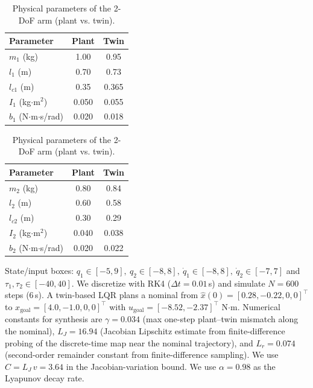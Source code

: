 \documentclass[letterpaper, 10 pt, conference]{ieeeconf}
\begin{document}
\begin{table}[ht]
\centering
\caption{Physical parameters of the 2-DoF arm (plant vs. twin).}
\label{tab:parameters}
\setlength{\tabcolsep}{4pt}
\renewcommand{\arraystretch}{1.05}
\begin{minipage}[t]{0.48\columnwidth}
\centering
\begin{tabular}{lcc}
\toprule
Parameter & Plant & Twin \\
\midrule
$m_1$ (kg)             & 1.00  & 0.95  \\
$l_1$ (m)              & 0.70  & 0.73  \\
$l_{c1}$ (m)           & 0.35  & 0.365 \\
$I_1$ (kg$\cdot$m$^2$) & 0.050 & 0.055 \\
$b_1$ (N$\cdot$m$\cdot$s/rad) & 0.020 & 0.018 \\
\bottomrule
\end{tabular}
\end{minipage}\hfill
\begin{minipage}[t]{0.48\columnwidth}
\centering
\begin{tabular}{lcc}
\toprule
Parameter & Plant & Twin \\
\midrule
$m_2$ (kg)             & 0.80  & 0.84  \\
$l_2$ (m)              & 0.60  & 0.58  \\
$l_{c2}$ (m)           & 0.30  & 0.29  \\
$I_2$ (kg$\cdot$m$^2$) & 0.040 & 0.038 \\
$b_2$ (N$\cdot$m$\cdot$s/rad) & 0.020 & 0.022 \\
\bottomrule
\end{tabular}
\end{minipage}
\end{table}

State/input boxes:
$q_1\!\in[-5,9],\ q_2\!\in[-8,8],\ \dot q_1\!\in[-8,8],\ \dot q_2\!\in[-7,7]$ and $\tau_1,\tau_2\!\in[-40,40]$.
We discretize with RK4 ($\Delta t=0.01$\,s) and simulate $N=600$ steps (6\,s). A twin-based LQR plans a nominal from $\hat x(0)=[0.28,-0.22,0,0]^\top$ to $x_{\mathrm{goal}}=[4.0,-1.0,0,0]^\top$ with $u_{\mathrm{goal}}=[-8.52,-2.37]^\top$ N$\cdot$m.
Numerical constants for synthesis are $\gamma=0.034$ (max one-step plant–twin mismatch along the nominal), $L_J=16.94$ (Jacobian Lipschitz estimate from finite-difference probing of the discrete-time map near the nominal trajectory), and $L_r=0.074$ (second-order remainder constant from finite-difference sampling). We use $C=L_J\,v=3.64$ in the Jacobian-variation bound. We use $\alpha=0.98$ as the Lyapunov decay rate.
\end{document}
